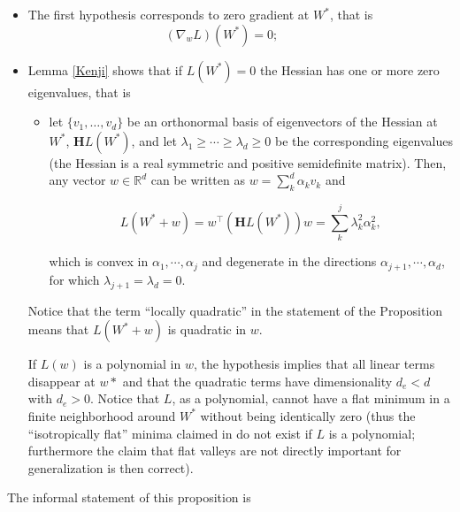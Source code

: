 \documentclass[10pt]{article}
\begin{document}
\begin{itemize}
\item The first hypothesis  corresponds to zero gradient at $W^*$,
  that is
\begin{equation}
(\nabla_w L) (W^*) = 0;\quad\quad\quad
\end{equation}

\item Lemma \ref{Kenji}  shows that if $L(W^*)=0$ the Hessian has one or more zero eigenvalues, that is 

\begin{itemize}
\item let $\{v_1,\dots,v_d\}$ be an orthonormal basis
of eigenvectors of the Hessian at $W^*$, $\mathbf{H} L(W^*)$, and
let $\lambda_1 \ge \cdots \ge \lambda_d \ge 0$ be the corresponding
eigenvalues (the Hessian is a real symmetric and positive
semidefinite matrix). Then, any vector $w \in \mathbb R^d$ can be
written as $w=\sum_{k}^{d}\alpha_k v_k$ and

\begin{equation}
L(W^*+w) = w^\top \left(\mathbf{H} L(W^*)\right) w= \sum_{k}^j \lambda^2_k\alpha_k^{2},
\label{quadraticapproximation}
\end{equation}


\noindent which is convex in $\alpha_1,\cdots, \alpha_j$ and
degenerate in the directions $\alpha_{j+1}, \cdots, \alpha_d$, for
which $\lambda_{j+1}=\lambda_{d}=0$.
\end{itemize}

Notice that the term ``locally quadratic'' in the statement of the
Proposition means that $L(W^* +w)$ is quadratic in $w$.

If $L(w)$ is a polynomial in $w$, the hypothesis implies that all
linear terms disappear at $w*$ and that the quadratic terms have
dimensionality $d_e<d$ with $d_e > 0$. Notice that $L$, as a
polynomial, cannot have a flat minimum in a finite neighborhood around
$W^*$ without being identically zero (thus the ``isotropically flat''
minima claimed in \cite{Musings2017} do not exist if $L$ is a
polynomial; furthermore the claim \cite{DBLP:journals/corr/DinhPBB17} that flat valleys are not directly
important for generalization is then correct).

\end{itemize}
The informal statement of this proposition is
\end{document}
